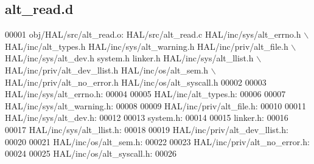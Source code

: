 \subsection{alt\+\_\+read.\+d}
\label{alt__read_8d_source}

\begin{DoxyCode}
00001 obj/HAL/src/alt\_read.o: HAL/src/alt\_read.c HAL/inc/sys/alt_errno.h \(\backslash\)
 HAL/inc/alt\_types.h HAL/inc/sys/alt\_warning.h HAL/inc/priv/alt\_file.h \(\backslash\)
 HAL/inc/sys/alt_dev.h system.h linker.h HAL/inc/sys/alt_llist.h \(\backslash\)
 HAL/inc/priv/alt_dev_llist.h HAL/inc/os/alt\_sem.h \(\backslash\)
 HAL/inc/priv/alt_no_error.h HAL/inc/os/alt\_syscall.h
00002 
00003 HAL/inc/sys/alt_errno.h:
00004 
00005 HAL/inc/alt\_types.h:
00006 
00007 HAL/inc/sys/alt\_warning.h:
00008 
00009 HAL/inc/priv/alt\_file.h:
00010 
00011 HAL/inc/sys/alt_dev.h:
00012 
00013 system.h:
00014 
00015 linker.h:
00016 
00017 HAL/inc/sys/alt_llist.h:
00018 
00019 HAL/inc/priv/alt_dev_llist.h:
00020 
00021 HAL/inc/os/alt\_sem.h:
00022 
00023 HAL/inc/priv/alt_no_error.h:
00024 
00025 HAL/inc/os/alt\_syscall.h:
00026 \end{DoxyCode}
